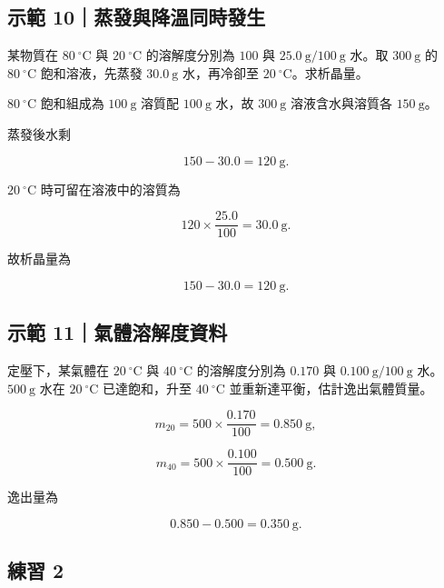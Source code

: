\documentclass[11pt,a4paper]{article}
\begin{document}
\begin{HandoutWorkedExample}

\subsection{示範 10｜蒸發與降溫同時發生}\label{ux793aux7bc4-10ux84b8ux767cux8207ux964dux6eabux540cux6642ux767cux751f}

某物質在 \(80\ ^\circ\mathrm C\) 與 \(20\ ^\circ\mathrm C\) 的溶解度分別為 \(100\) 與 \(25.0\ \mathrm g/100\ \mathrm g\) 水。取 \(300\ \mathrm g\) 的 \(80\ ^\circ\mathrm C\) 飽和溶液，先蒸發 \(30.0\ \mathrm g\) 水，再冷卻至 \(20\ ^\circ\mathrm C\)。求析晶量。

\(80\ ^\circ\mathrm C\) 飽和組成為 \(100\ \mathrm g\) 溶質配 \(100\ \mathrm g\) 水，故 \(300\ \mathrm g\) 溶液含水與溶質各 \(150\ \mathrm g\)。

蒸發後水剩

\[
150-30.0=120\ \mathrm g.
\]

\(20\ ^\circ\mathrm C\) 時可留在溶液中的溶質為

\[
120\times\frac{25.0}{100}=30.0\ \mathrm g.
\]

故析晶量為

\[
150-30.0=120\ \mathrm g.
\]

\end{HandoutWorkedExample}

\begin{HandoutWorkedExample}

\subsection{示範 11｜氣體溶解度資料}\label{ux793aux7bc4-11ux6c23ux9ad4ux6eb6ux89e3ux5ea6ux8cc7ux6599}

定壓下，某氣體在 \(20\ ^\circ\mathrm C\) 與 \(40\ ^\circ\mathrm C\) 的溶解度分別為 \(0.170\) 與 \(0.100\ \mathrm g/100\ \mathrm g\) 水。\(500\ \mathrm g\) 水在 \(20\ ^\circ\mathrm C\) 已達飽和，升至 \(40\ ^\circ\mathrm C\) 並重新達平衡，估計逸出氣體質量。

\[
m_{20}=500\times\frac{0.170}{100}=0.850\ \mathrm g,
\]

\[
m_{40}=500\times\frac{0.100}{100}=0.500\ \mathrm g.
\]

逸出量為

\[
0.850-0.500=0.350\ \mathrm g.
\]

\end{HandoutWorkedExample}

\subsection{練習 2}\label{ux7df4ux7fd2-2}
\end{document}
